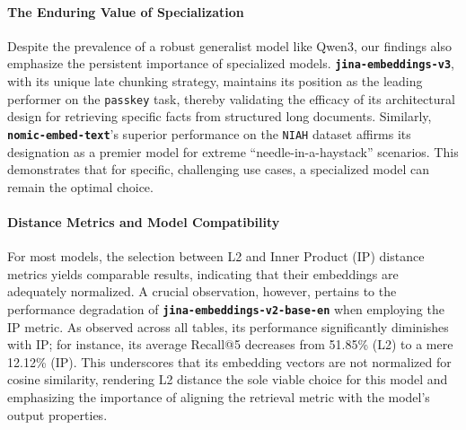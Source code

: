 \paragraph{The Enduring Value of Specialization}
Despite the prevalence of a robust generalist model like Qwen3, our findings also emphasize the persistent importance of specialized models. \textbf{\texttt{jina-embeddings-v3}}, with its unique late chunking strategy, maintains its position as the leading performer on the \texttt{passkey} task, thereby validating the efficacy of its architectural design for retrieving specific facts from structured long documents. Similarly, \textbf{\texttt{nomic-embed-text}}'s superior performance on the \texttt{NIAH} dataset affirms its designation as a premier model for extreme \enquote{needle-in-a-haystack} scenarios. This demonstrates that for specific, challenging use cases, a specialized model can remain the optimal choice.

\paragraph{Distance Metrics and Model Compatibility}
For most models, the selection between L2 and Inner Product (IP) distance metrics yields comparable results, indicating that their embeddings are adequately normalized. A crucial observation, however, pertains to the performance degradation of \textbf{\texttt{jina-embeddings-v2-base-en}} when employing the IP metric. As observed across all tables, its performance significantly diminishes with IP; for instance, its average Recall@5 decreases from 51.85\% (L2) to a mere 12.12\% (IP). This underscores that its embedding vectors are not normalized for cosine similarity, rendering L2 distance the sole viable choice for this model and emphasizing the importance of aligning the retrieval metric with the model's output properties.


